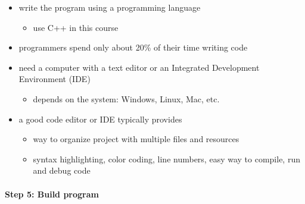 \documentclass[11pt]{article}
\providecommand{\tightlist}{%
      \setlength{\itemsep}{0pt}\setlength{\parskip}{0pt}}
\begin{document}
\begin{itemize}
\tightlist
\item
  write the program using a programming language

  \begin{itemize}
  \tightlist
  \item
    use C++ in this course
  \end{itemize}
\item
  programmers spend only about 20\% of their time writing code
\item
  need a computer with a text editor or an Integrated Development
  Environment (IDE)

  \begin{itemize}
  \tightlist
  \item
    depends on the system: Windows, Linux, Mac, etc.
  \end{itemize}
\item
  a good code editor or IDE typically provides

  \begin{itemize}
  \tightlist
  \item
    way to organize project with multiple files and resources
  \item
    syntax highlighting, color coding, line numbers, easy way to
    compile, run and debug code
  \end{itemize}
\end{itemize}

\hypertarget{step-5-build-program}{%
\paragraph{Step 5: Build program}\label{step-5-build-program}}
\end{document}
